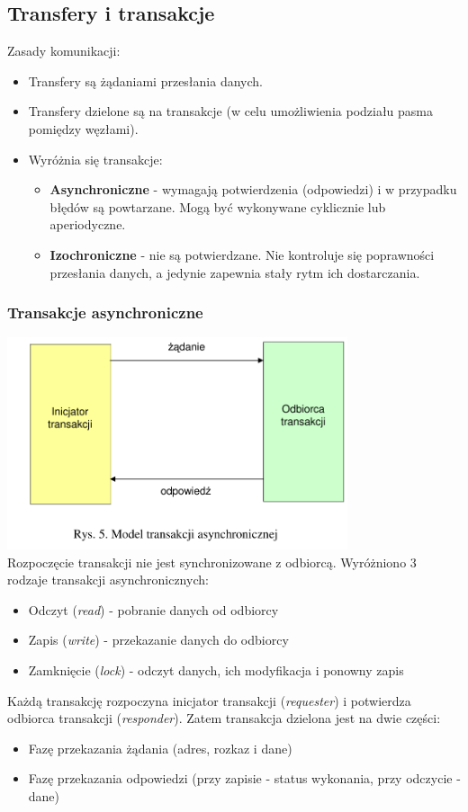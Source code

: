 \subsection{Transfery i transakcje}
Zasady komunikacji:
\begin{itemize}
	\item Transfery są żądaniami przesłania danych.
	\item Transfery dzielone są na transakcje (w celu umożliwienia podziału pasma pomiędzy węzłami).
	\item Wyróżnia się transakcje:
	\begin{itemize}
		\item \textbf{Asynchroniczne} - wymagają potwierdzenia (odpowiedzi) i w przypadku błędów są powtarzane. Mogą być wykonywane cyklicznie lub aperiodyczne.
		\item \textbf{Izochroniczne} - nie są potwierdzane. Nie kontroluje się poprawności przesłania danych, a jedynie zapewnia stały rytm ich dostarczania.
	\end{itemize} 
\end{itemize}

	\subsubsection{Transakcje asynchroniczne}
	\includegraphics[width=10cm]{./wyklady/FIREWIRE_7_1.pdf}\\
	Rozpoczęcie transakcji nie jest synchronizowane z odbiorcą. Wyróżniono 3 rodzaje transakcji asynchronicznych:
	\begin{itemize}
		\item Odczyt (\emph{read}) - pobranie danych od odbiorcy
		\item Zapis (\emph{write}) - przekazanie danych do odbiorcy
		\item Zamknięcie (\emph{lock}) - odczyt danych, ich modyfikacja i ponowny zapis
	\end{itemize}
	Każdą transakcję rozpoczyna inicjator transakcji (\emph{requester}) i potwierdza odbiorca transakcji (\emph{responder}). Zatem transakcja dzielona jest na dwie części:
	\begin{itemize}
		\item Fazę przekazania żądania (adres, rozkaz i dane)
		\item Fazę przekazania odpowiedzi (przy zapisie - status wykonania, przy odczycie - dane)
	\end{itemize}
	
